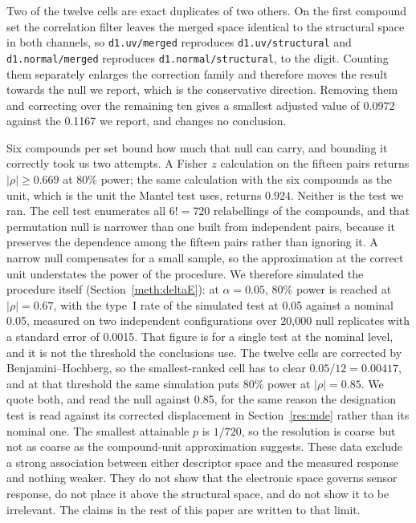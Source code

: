 \documentclass[journal=jacsat,manuscript=suppinfo,margin=1in]{achemso}
\begin{document}
Two of the twelve cells are exact duplicates of two others. On the first
compound set the correlation filter leaves the merged space identical to the
structural space in both channels, so \texttt{d1.uv/merged} reproduces
\texttt{d1.uv/structural} and \texttt{d1.normal/merged} reproduces
\texttt{d1.normal/structural}, to the digit. Counting them separately
enlarges the correction family and therefore moves the result towards the
null we report, which is the conservative direction. Removing them and
correcting over the remaining ten gives a smallest adjusted value of 0.0972
against the 0.1167 we report, and changes no conclusion.

Six compounds per set bound how much that null can carry, and bounding it
correctly took us two attempts. A Fisher $z$ calculation on the fifteen pairs
returns $|\rho| \ge 0.669$ at 80\% power; the same calculation with the six
compounds as the unit, which is the unit the Mantel test uses, returns $0.924$.
Neither is the test we ran. The cell test enumerates all $6! = 720$ relabellings
of the compounds, and that permutation null is narrower than one built from
independent pairs, because it preserves the dependence among the fifteen pairs
rather than ignoring it. A narrow null compensates for a small sample, so the
approximation at the correct unit understates the power of the procedure. We
therefore simulated the procedure itself (Section~\ref{meth:deltaE}): at
$\alpha = 0.05$, 80\% power is reached at $|\rho| = 0.67$, with the type~I rate
of the simulated test at 0.05 against a nominal 0.05, measured on two
independent configurations over 20,000 null replicates with a standard error of
0.0015. That figure is for a single test at the nominal level, and it is not
the threshold the conclusions use. The twelve cells are corrected by
Benjamini--Hochberg, so the smallest-ranked cell has to clear $0.05/12 =
0.00417$, and at that threshold the same simulation puts 80\% power at
$|\rho| = 0.85$. We quote both, and read the null against 0.85, for the same
reason the designation test is read against its corrected displacement in
Section~\ref{res:mde} rather than its nominal one. The smallest attainable
$p$ is $1/720$, so the resolution is coarse but not as coarse as the
compound-unit approximation suggests. These data exclude a strong association
between either descriptor space and the measured response and nothing weaker. They do not show that the
electronic space governs sensor response, do not place it above the structural
space, and do not show it to be irrelevant. The claims in the rest of this paper
are written to that limit.
\end{document}
